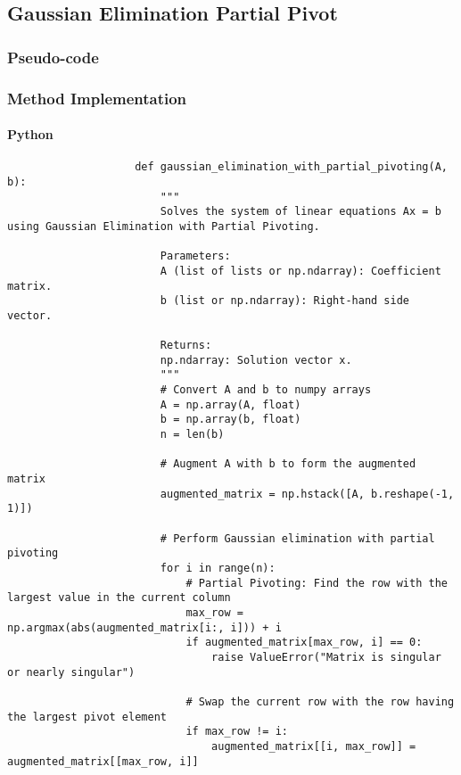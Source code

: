 \documentclass{article}
\begin{document}
    \subsection{Gaussian Elimination Partial Pivot}
        \subsubsection{Pseudo-code}
        \subsubsection{Method Implementation}
            \paragraph{Python}
                \begin{verbatim}
                    def gaussian_elimination_with_partial_pivoting(A, b):
                        """
                        Solves the system of linear equations Ax = b using Gaussian Elimination with Partial Pivoting.

                        Parameters:
                        A (list of lists or np.ndarray): Coefficient matrix.
                        b (list or np.ndarray): Right-hand side vector.

                        Returns:
                        np.ndarray: Solution vector x.
                        """
                        # Convert A and b to numpy arrays
                        A = np.array(A, float)
                        b = np.array(b, float)
                        n = len(b)

                        # Augment A with b to form the augmented matrix
                        augmented_matrix = np.hstack([A, b.reshape(-1, 1)])

                        # Perform Gaussian elimination with partial pivoting
                        for i in range(n):
                            # Partial Pivoting: Find the row with the largest value in the current column
                            max_row = np.argmax(abs(augmented_matrix[i:, i])) + i
                            if augmented_matrix[max_row, i] == 0:
                                raise ValueError("Matrix is singular or nearly singular")

                            # Swap the current row with the row having the largest pivot element
                            if max_row != i:
                                augmented_matrix[[i, max_row]] = augmented_matrix[[max_row, i]]


\end{verbatim}
\end{document}
